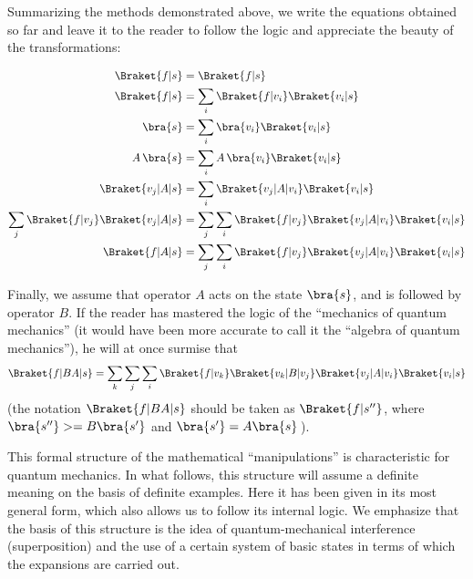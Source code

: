 \documentclass[a4paper,sfsidenotes,colorlinks=true]{tufte-book}
\numberwithin{equation}{section}
\numberwithin{figure}{section}
\begin{document}
Summarizing the methods demonstrated above, we write the equations
obtained so far and leave it to the reader to follow the logic and
appreciate the beauty of the transformations:\\[8pt]
\begin{mdframed}
 \begin{align*}
 \Braket{f|s} & = \Braket{f|s}\\
 \Braket{f|s} & = \sum_{i} \Braket{f|v_{i}}\Braket{v_{i}|s}\\
\bra{s} & = \sum_{i} \bra{v_{i}}\Braket{v_{i}|s}\\
A\, \bra{s} & = \sum_{i} A\, \bra{v_{i}}\Braket{v_{i}|s}\\
\Braket{v_{j}| A |s} & = \sum_{i}
\Braket{v_{j}|A|v_{i}}\Braket{v_{i}|s}\\
\sum_{j} \Braket{f| v_{j}} \Braket{v_{j}|A|s} & = \sum_{j} \sum_{i}
\Braket{f|v_{j}} \Braket{v_{j}|A|v_{i}}  \Braket{v_{i}|s}\\
\Braket{f|A|s} & = \sum_{j} \sum_{i}
\Braket{f|v_{j}} \Braket{v_{j}|A|v_{i}}  \Braket{v_{i}|s}
 \end{align*}

\end{mdframed}
Finally, we assume that operator $A$ acts on the state $\bra{s}$, and is
followed by operator $B$. If the reader has mastered the logic of the
``mechanics of quantum mechanics'' (it would have been more accurate to
call it the ``algebra of quantum mechanics''), he will at once surmise
that
\begin{equation}
\Braket{f| BA |s} = \sum_{k} \sum_{j} \sum_{i} \Braket{f|v_{k}}
\Braket{v_{k} | B | v_{j}} \Braket{v_{j}| A | v_{i}} \Braket{v_{i}|s}
\label{eq-10.24}
\end{equation}
(the notation $\Braket{f|BA|s}$ should be taken as $\Braket{f|s''}$,
where $\bra{s''}>= B \bra{s'}$ and $\bra{s'}= A \bra{s}\,$).

This formal structure of the mathematical ``manipulations'' is
characteristic for quantum mechanics. In what follows, this structure
will assume a definite meaning on the basis of definite examples. Here
it has been given in its most general form, which also allows us to
follow its internal logic. We emphasize that the basis of this
structure is the idea of quantum-mechanical interference
(superposition) and the use of a certain system of basic states in
terms of which the expansions are carried out.  
\end{document}
